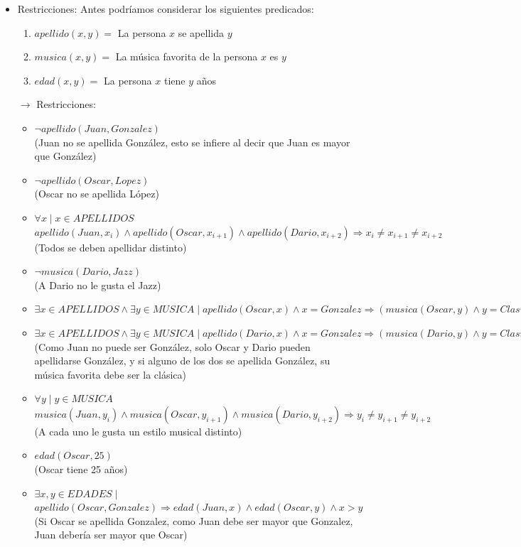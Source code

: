 \documentclass[12pt]{article}
\begin{document}
\begin{itemize}
\begin{itemize}
\end{itemize}
\item Restricciones:
Antes podríamos considerar los siguientes predicados:
\begin{enumerate}
\item $apellido(x,y) = $ La persona $x$ se apellida $y$
\item $musica(x,y) = $ La música favorita de la persona $x$ es $y$
\item $edad(x,y) = $ La persona $x$ tiene $y$ años
\end{enumerate}
$\rightarrow$ Restricciones:
\begin{itemize}
\item $\neg apellido(Juan, Gonzalez)$ \\ (Juan no se apellida González, esto se infiere al decir que Juan es mayor que González)
\item $\neg apellido(Oscar, Lopez)$ \\ (Oscar no se apellida López)
\item $\forall x \mid x \in APELLIDOS$ \\ $apellido(Juan,x_{i}) \land apellido(Oscar,x_{i+1}) \land apellido(Dario,x_{i+2}) \Rightarrow x_{i} \neq x_{i+1} \neq x_{i+2}$ \\ (Todos se deben apellidar distinto)
\item $\neg musica(Dario, Jazz)$ \\ (A Dario no le gusta el Jazz)
\item $\exists x \in APELLIDOS \land \exists y \in MUSICA \mid apellido(Oscar,x) \land x = Gonzalez \Rightarrow (musica(Oscar, y) \land y = Clasica)$
\item $\exists x \in APELLIDOS \land \exists y \in MUSICA \mid apellido(Dario,x) \land x = Gonzalez \Rightarrow (musica(Dario, y) \land y = Clasica)$ \\ (Como Juan no puede ser González, solo Oscar y Dario pueden apellidarse González, y si alguno de los dos se apellida González, su música favorita debe ser la clásica)
\item $\forall y \mid y \in MUSICA$ \\ $musica(Juan,y_{i}) \land musica(Oscar,y_{i+1}) \land musica(Dario,y_{i+2}) \Rightarrow y_{i} \neq y_{i+1} \neq y_{i+2}$ \\ (A cada uno le gusta un estilo musical distinto)
\item $edad(Oscar, 25)$ \\ (Oscar tiene 25 años)
\item $\exists x,y \in EDADES \mid$ \\ $ apellido(Oscar, Gonzalez) \Rightarrow edad(Juan,x) \land edad(Oscar,y) \land x > y$ \\ (Si Oscar se apellida Gonzalez, como Juan debe ser mayor que Gonzalez, Juan debería ser mayor que Oscar)

\end{itemize}
\end{itemize}
\end{document}
